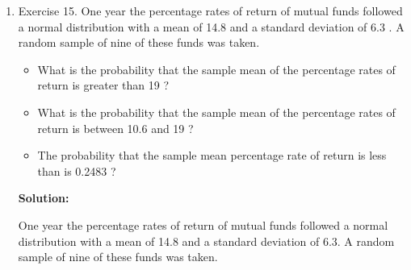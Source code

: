 \documentclass[12pt]{article}
\begin{document}
\begin{enumerate}
{\color{blue}
\noindent \textbf{Solution:}

We are given that the distribution of annual percentage salary increases for managers follows a normal distribution with a mean of 12.2\% and a standard deviation of 3.6\%. We are also told that a random sample of 9 observations is drawn from this population, and we need to find the probability that the sample mean is less than 10\%.

The sample mean, denoted by $\bar{X}$, is a random variable itself and follows a normal distribution with mean equal to the population mean, 12.2\%, and standard deviation equal to the population standard deviation divided by the square root of the sample size, which is 9 in this case. Thus, we have:

$$\bar{X} \sim N\left(\mu = 12.2\%,\ \sigma = \frac{3.6\%}{\sqrt{9}} = 1.2\%\right)$$

We want to find the probability that the sample mean is less than 10\%, which is equivalent to finding the probability that a standard normal variable, $Z$, is less than:

$$Z = \frac{\bar{X} - \mu}{\sigma} = \frac{10\% - 12.2\%}{1.2\%} = -1.83$$
	
Using a standard normal distribution table or calculator, we can find that $P(Z < -1.83) \approx 0.0336$. Therefore, the probability that the sample mean is less than 10\% is approximately 0.0336 or about 3.36\%.

}

\item   Exercise 15. One year the percentage rates of return of mutual funds followed a normal distribution with a mean of 14.8 and a standard deviation of 6.3 . A random sample of nine of these funds was taken.
\begin{itemize}
    \item What is the probability that the sample mean of the percentage rates of return is greater than 19 ?
    \item What is the probability that the sample mean of the percentage rates of return is between 10.6 and 19 ?
    \item  The probability that the sample mean percentage rate of return is less than is 0.2483 ?
\end{itemize}


{\color{blue}
\noindent \textbf{Solution:}

One year the percentage rates of return of mutual funds followed a normal distribution with a mean of 14.8 and a standard deviation of 6.3. A random sample of nine of these funds was taken.

}
\end{enumerate}
\end{document}
